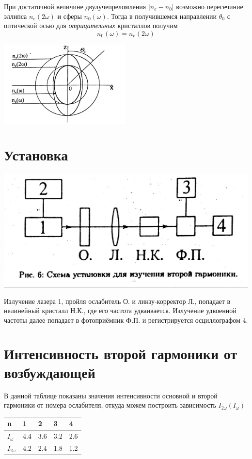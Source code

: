\documentclass[a4paper,14pt]{article} %
\begin{document}
При достаточной величине двулучепреломления $|n_e - n_0|$ возможно пересечиние эллипса $n_e(2 \omega)$ и сферы $n_0(\omega)$. Тогда в получившемся направлении $\theta_0$ с оптической осью для \textit{отрицательных} кристаллов получим
\begin{equation}
n_0(\omega) = n_e(2 \omega)
\end{equation}

\begin{center}
\includegraphics[width = 0.5\textwidth]{images/ellips}\\
\end{center}


\section{Установка}
\begin{center}
\includegraphics[width = 0.5 \textwidth]{images/setup.jpg}
\end{center}
Излучение лазера 1, пройля ослабитель О. и линзу-корректор Л., попадает в нелинейный кристалл Н.К., где его частота удваивается. Излучение удвоенной частоты далее попадает в фотоприёмник Ф.П. и регистрируется осциллографом 4.

\section{Интенсивность второй гармоники от возбуждающей}
В данной таблице показаны значения интенсивности основной и второй гармоники от номера ослабителя, откуда можем построить зависимость $I_{2 \omega} (I_{\omega})$

\begin{table}[H]
\begin{tabular}{|l|l|l|l|l|}
\hline
n     & 1   & 2   & 3   & 4   \\ \hline
$I_{\omega}$  & 4.4 & 3.6 & 3.2 & 2.6 \\ \hline
$I_{2 \omega}$ & 4.2 & 2.4 & 1.8 & 1.2 \\ \hline
\end{tabular}
\end{table}
\end{document}
